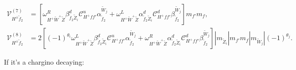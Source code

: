 \documentclass[final,3p,times]{elsarticle}
\begin{document}
\begin{align}
\mathcal{V}_{H^{\pm} \tilde{f}_2}^{(7)} &= [\omega_{H^+ \tilde{W}^+ \tilde{Z}}^R \beta_{\tilde{f}_2 \tilde{Z}_i}^{d} \mathcal{C}_{H^+ f f'}^u \alpha_{\tilde{f}_2}^{\tilde{W}_j} + \omega_{H^+ \tilde{W}^+ \tilde{Z}}^L \alpha_{\tilde{f}_2 \tilde{Z}_i}^{d} \mathcal{C}_{H^+ f f'}^d \beta_{\tilde{f}_2}^{\tilde{W}_j}]m_{f'}m_{f}, \\
\mathcal{V}_{H^{\pm} \tilde{f}_2}^{(8)} &= 2[(-1)^{\theta_i}\omega_{H^+ \tilde{W}^+ \tilde{Z}}^L  \beta_{\tilde{f}_2 \tilde{Z}_i}^{d} \mathcal{C}_{H^+ f f'}^u \alpha_{\tilde{f}_2}^{\tilde{W}_j} +  \omega_{H^+ \tilde{W}^+ \tilde{Z}}^R \alpha_{\tilde{f}_2 \tilde{Z}_i}^{d} \mathcal{C}_{H^+ f f'}^d \beta_{\tilde{f}_2}^{\tilde{W}_j}]|m_{\tilde{Z}_i}|m_{f'}m_{f}|m_{\tilde{W}_j}|(-1)^{\theta_j}.
\end{align}

If it's a chargino decaying:
\end{document}
